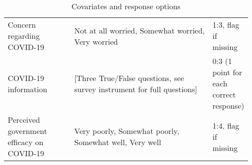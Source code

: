 \begin{table}[H]
\begin{adjustbox}{totalheight=.9\baselineskip, max width = \textwidth}
\begin{tabular}{p{0.3\linewidth}p{0.7\linewidth}p{0.25\linewidth}}
Concern regarding COVID-19                  & Not at all worried, Somewhat worried,  Very   worried      & 1:3, flag if missing                     \\
COVID-19 information & [Three True/False questions, see survey instrument for full questions] & 0:3 (1 point for each correct response)\\
Perceived government efficacy   on COVID-19 & Very   poorly, Somewhat poorly, Somewhat well, Very well   & 1:4, flag if missing \\
\end{tabular} 
\end{adjustbox}
\caption{Covariates and response options}
\label{cov_long}
\end{table}